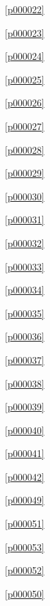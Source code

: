 \noindent\figurename\ \ref{p000022}\dotfill\pageref{p000022}

\noindent\figurename\ \ref{p000023}\dotfill\pageref{p000023}

\noindent\figurename\ \ref{p000024}\dotfill\pageref{p000024}

\noindent\figurename\ \ref{p000025}\dotfill\pageref{p000025}

\noindent\figurename\ \ref{p000026}\dotfill\pageref{p000026}

\noindent\figurename\ \ref{p000027}\dotfill\pageref{p000027}

\noindent\figurename\ \ref{p000028}\dotfill\pageref{p000028}

\noindent\figurename\ \ref{p000029}\dotfill\pageref{p000029}

\noindent\figurename\ \ref{p000030}\dotfill\pageref{p000030}

\noindent\figurename\ \ref{p000031}\dotfill\pageref{p000031}

\noindent\figurename\ \ref{p000032}\dotfill\pageref{p000032}

\noindent\figurename\ \ref{p000033}\dotfill\pageref{p000033}

\noindent\figurename\ \ref{p000034}\dotfill\pageref{p000034}

\noindent\figurename\ \ref{p000035}\dotfill\pageref{p000035}

\noindent\figurename\ \ref{p000036}\dotfill\pageref{p000036}

\noindent\figurename\ \ref{p000037}\dotfill\pageref{p000037}

\noindent\figurename\ \ref{p000038}\dotfill\pageref{p000038}

\noindent\figurename\ \ref{p000039}\dotfill\pageref{p000039}

\noindent\figurename\ \ref{p000040}\dotfill\pageref{p000040}

\noindent\figurename\ \ref{p000041}\dotfill\pageref{p000041}

\noindent\figurename\ \ref{p000042}\dotfill\pageref{p000042}

\noindent\figurename\ \ref{p000049}\dotfill\pageref{p000049}

\noindent\figurename\ \ref{p000051}\dotfill\pageref{p000051}

\noindent\figurename\ \ref{p000053}\dotfill\pageref{p000053}

\noindent\figurename\ \ref{p000052}\dotfill\pageref{p000052}

\noindent\figurename\ \ref{p000050}\dotfill\pageref{p000050}

